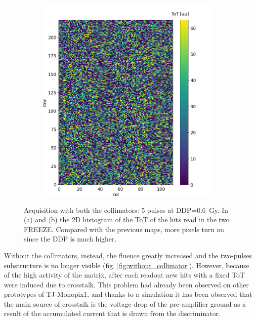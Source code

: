 \begin{figure}
\begin{subfigure}[b]{0.49\textwidth}
         \includegraphics[width=\linewidth]{figures/test_beam/tot_mapq2_15-57.png}  
         \caption{}
         \label{fig:aa2}
     \end{subfigure}
      \caption{Acquisition with both the collimators: 5 pulses at DDP=\SI{0.6}{Gy}. In (a) and (b) the 2D histogram of the ToT of the hits read in the two FREEZE. Compared with the previous maps, more pixels turn on since the DDP is much higher.}
      \label{fig:hit_map_full_matrix}
  \end{figure}

  Without the collimators, instead, the fluence greatly increased and the two-pulses substructure is no longer visible (fig. \ref{fig:without_collimator}). However, because of the high activity of the matrix, after each readout new hits with a fixed ToT were induced due to crosstalk.  
   This problem had already been observed on other prototypes of TJ-Monopix1, and thanks to a simulation it has been observed that the main source of crosstalk is the voltage drop of the pre-amplifier ground as a result of the accumulated current that is drawn from the discriminator.   
   
